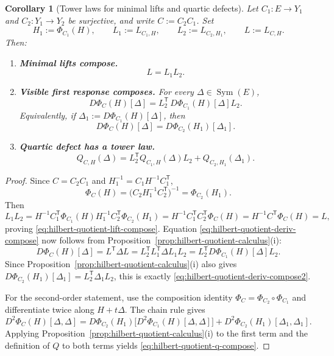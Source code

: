 \documentclass[11pt,a4paper]{article}
\numberwithin{equation}{section}
\DeclareMathOperator{\Sym}{Sym}
\theoremstyle{thmcompact}
\newtheorem{corollary}[theorem]{Corollary}
\theoremstyle{remark}
\begin{document}
\begin{corollary}[Tower laws for minimal lifts and quartic defects]\label{cor:hilbert-quotient-tower}
Let $C_1 : E \to Y_1$ and $C_2 : Y_1 \to Y_2$ be surjective, and write $C:=C_2C_1$. Set
\[
H_1:=\Phi_{C_1}(H),
\qquad
L_1:=L_{C_1,H},
\qquad
L_2:=L_{C_2,H_1},
\qquad
L:=L_{C,H}.
\]
Then:
\begin{enumerate}[label=\textup{(\roman*)}]
\item \textbf{Minimal lifts compose.}
\begin{equation}\label{eq:hilbert-quotient-lift-compose}
L=L_1L_2.
\end{equation}

\item \textbf{Visible first response composes.} For every $\Delta \in \Sym(E)$,
\begin{equation}\label{eq:hilbert-quotient-deriv-compose}
D\Phi_C(H)[\Delta]=L_2^{\mathsf T}\,D\Phi_{C_1}(H)[\Delta]L_2.
\end{equation}
Equivalently, if $\Delta_1:=D\Phi_{C_1}(H)[\Delta]$, then
\begin{equation}\label{eq:hilbert-quotient-deriv-compose2}
D\Phi_C(H)[\Delta]=D\Phi_{C_2}(H_1)[\Delta_1].
\end{equation}

\item \textbf{Quartic defect has a tower law.}
\begin{equation}\label{eq:hilbert-quotient-q-compose}
Q_{C,H}(\Delta)=L_2^{\mathsf T}Q_{C_1,H}(\Delta)L_2+Q_{C_2,H_1}(\Delta_1).
\end{equation}
\end{enumerate}
\end{corollary}

\begin{proof}
Since $C=C_2C_1$ and $H_1^{-1}=C_1H^{-1}C_1^{\mathsf T}$,
\[
\Phi_C(H)=\bigl(C_2H_1^{-1}C_2^{\mathsf T}\bigr)^{-1}=\Phi_{C_2}(H_1).
\]
Then
\[
L_1L_2=H^{-1}C_1^{\mathsf T}\Phi_{C_1}(H)H_1^{-1}C_2^{\mathsf T}\Phi_{C_2}(H_1)=H^{-1}C_1^{\mathsf T}C_2^{\mathsf T}\Phi_C(H)=H^{-1}C^{\mathsf T}\Phi_C(H)=L,
\]
proving \eqref{eq:hilbert-quotient-lift-compose}. Equation \eqref{eq:hilbert-quotient-deriv-compose} now follows from Proposition~\ref{prop:hilbert-quotient-calculus}(i):
\[
D\Phi_C(H)[\Delta]=L^{\mathsf T}\Delta L=L_2^{\mathsf T}L_1^{\mathsf T}\Delta L_1L_2=L_2^{\mathsf T}D\Phi_{C_1}(H)[\Delta]L_2.
\]
Since Proposition~\ref{prop:hilbert-quotient-calculus}(i) also gives $D\Phi_{C_2}(H_1)[\Delta_1]=L_2^{\mathsf T}\Delta_1L_2$, this is exactly \eqref{eq:hilbert-quotient-deriv-compose2}.

For the second-order statement, use the composition identity $\Phi_C=\Phi_{C_2}\circ\Phi_{C_1}$ and differentiate twice along $H+t\Delta$. The chain rule gives
\[
D^2\Phi_C(H)[\Delta,\Delta]
=D\Phi_{C_2}(H_1)\bigl[D^2\Phi_{C_1}(H)[\Delta,\Delta]\bigr]
+D^2\Phi_{C_2}(H_1)[\Delta_1,\Delta_1].
\]
Applying Proposition~\ref{prop:hilbert-quotient-calculus}(i) to the first term and the definition of $Q$ to both terms yields \eqref{eq:hilbert-quotient-q-compose}.
\end{proof}
\end{document}
